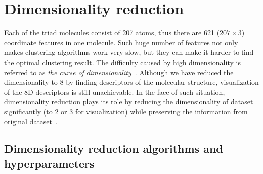\documentclass[a4paper]{article}
\begin{document}
\pagebreak

\section{Dimensionality reduction}

Each of the triad molecules consist of 207 atoms, thus there are 621 (\(207 \times 3\)) coordinate features in one molecule. Such huge number of features not only makes clustering algorithms work very slow, but they can make it harder to find the optimal clustering result. The difficulty caused by high dimensionality is referred to as \textit{the curse of dimensionality}~\cite{GeronAurelien}. Although we have reduced the dimensionality to 8 by finding descriptors of the molecular structure, visualization of the 8D descriptors is still unachievable. In the face of such situation, dimensionality reduction plays its role by reducing the dimensionality of dataset significantly (to 2 or 3 for visualization) while preserving the information from original dataset~\cite{GlielmoAldo}.

\subsection{Dimensionality reduction algorithms and hyperparameters}
\end{document}
